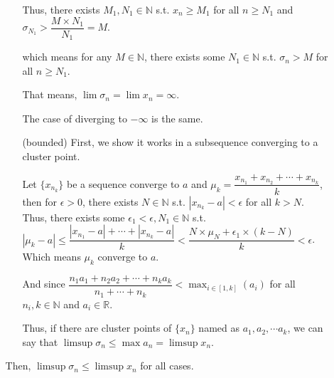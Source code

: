 \documentclass[12pt]{article}
\begin{document}
\begin{enumerate}
\begin{enumerate}[(a)]
\begin{enumerate}
            Thus, there exists $M_1, N_1 \in \mathbb{N}$ s.t. $x_n \geq M_1$ for all $n \geq N_1$ and $\sigma_{N_1} > \dfrac{M\times N_1}{N_1} = M$.

            which means for any $M \in \mathbb{N}$, there exists some $N_1 \in \mathbb{N}$ s.t. $\sigma_n > M$ for all $n \geq N_1$.

            That means, $\lim \sigma_n = \lim x_n = \infty$.

            The case of diverging to $-\infty$ is the same.

            \item[(bounded)] First, we show it works in a subsequence converging to a cluster point.
            
            Let $\lbrace x_{n_k}\rbrace$ be a sequence converge to $a$ and $\mu_{k} = \dfrac{x_{n_1} + x_{n_2} + \cdots + x_{n_k}}{k}$, then for $\epsilon > 0$, there exists $N\in \mathbb{N}$ s.t. $|x_{n_k} - a| < \epsilon$ for all $k > N$.
            Thus, there exists some $\epsilon_1< \epsilon, N_1\in \mathbb{N}$ s.t. $|\mu_k - a| \leq \dfrac{|x_{n_1} - a| + \cdots + |x_{n_k} - a|}{k} < \dfrac{N\times \mu_N + \epsilon_1\times (k-N)}{k} < \epsilon$.
            Which means $\mu_k$ converge to $a$.

            And since $\dfrac{n_1 a_1 + n_2 a_2 + \cdots + n_k a_k}{n_1 + \cdots + n_k} < \displaystyle\max_{i\in [1, k]}(a_i)$ for all $n_i, k\in \mathbb{N}$ and $a_i \in \mathbb{R}$.

            Thus, if there are cluster points of $\lbrace x_n\rbrace$ named as $a_1, a_2, \cdots a_k$, we can say that $\limsup \sigma_n \leq \max a_n = \limsup x_n$.
        \end{enumerate}
        
        Then, $\limsup \sigma_n \leq \limsup x_n$ for all cases.
    \end{enumerate}
\end{enumerate}
\end{document}
